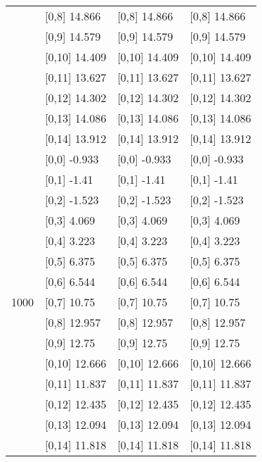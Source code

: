 \begin{table}
\begin{tabular}[t]{llll}
 & {}[0,8] 14.866 & {}[0,8] 14.866 & {}[0,8] 14.866\\
 & {}[0,9] 14.579 & {}[0,9] 14.579 & {}[0,9] 14.579\\
\addlinespace
 & {}[0,10] 14.409 & {}[0,10] 14.409 & {}[0,10] 14.409\\
 & {}[0,11] 13.627 & {}[0,11] 13.627 & {}[0,11] 13.627\\
 & {}[0,12] 14.302 & {}[0,12] 14.302 & {}[0,12] 14.302\\
 & {}[0,13] 14.086 & {}[0,13] 14.086 & {}[0,13] 14.086\\
 & {}[0,14] 13.912 & {}[0,14] 13.912 & {}[0,14] 13.912\\
\addlinespace
 & {}[0,0] -0.933 & {}[0,0] -0.933 & {}[0,0] -0.933\\
 & {}[0,1] -1.41 & {}[0,1] -1.41 & {}[0,1] -1.41\\
 & {}[0,2] -1.523 & {}[0,2] -1.523 & {}[0,2] -1.523\\
 & {}[0,3] 4.069 & {}[0,3] 4.069 & {}[0,3] 4.069\\
 & {}[0,4] 3.223 & {}[0,4] 3.223 & {}[0,4] 3.223\\
\addlinespace
 & {}[0,5] 6.375 & {}[0,5] 6.375 & {}[0,5] 6.375\\
 & {}[0,6] 6.544 & {}[0,6] 6.544 & {}[0,6] 6.544\\
1000 & {}[0,7] 10.75 & {}[0,7] 10.75 & {}[0,7] 10.75\\
 & {}[0,8] 12.957 & {}[0,8] 12.957 & {}[0,8] 12.957\\
 & {}[0,9] 12.75 & {}[0,9] 12.75 & {}[0,9] 12.75\\
\addlinespace
 & {}[0,10] 12.666 & {}[0,10] 12.666 & {}[0,10] 12.666\\
 & {}[0,11] 11.837 & {}[0,11] 11.837 & {}[0,11] 11.837\\
 & {}[0,12] 12.435 & {}[0,12] 12.435 & {}[0,12] 12.435\\
 & {}[0,13] 12.094 & {}[0,13] 12.094 & {}[0,13] 12.094\\
 & {}[0,14] 11.818 & {}[0,14] 11.818 & {}[0,14] 11.818\\
\bottomrule
\end{tabular}
\end{table}
